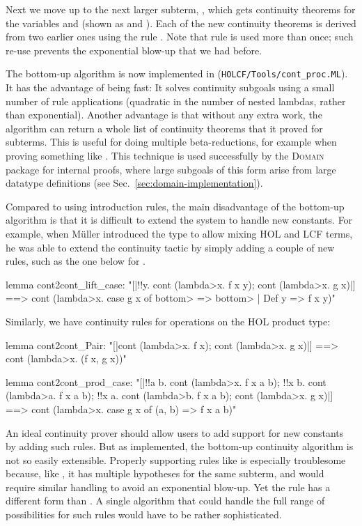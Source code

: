 Next we move up to the next larger subterm, , which gets continuity theorems for the variables  and  (shown as  and ). Each of the new continuity theorems is derived from two earlier ones using the rule . Note that rule  is used more than once; such re-use prevents the exponential blow-up that we had before.

The bottom-up algorithm is now implemented in  (\texttt{HOLCF/Tools{\slash}cont\_proc.ML}). It has the advantage of being fast: It solves continuity subgoals using a small number of rule applications (quadratic in the number of nested lambdas, rather than exponential). Another advantage is that without any extra work, the algorithm can return a whole list of continuity theorems that it proved for subterms. This is useful for doing multiple beta-reductions, for example when proving something like . This technique is used successfully by the \textsc{Domain} package for internal proofs, where large subgoals of this form arise from large datatype definitions (see Sec.~\ref{sec:domain-implementation}).

Compared to using introduction rules, the main disadvantage of the bottom-up algorithm is that it is difficult to extend the system to handle new constants. For example, when M\"{u}ller introduced the  type to allow mixing HOL and LCF terms, he was able to extend the continuity tactic by simply adding a couple of new rules, such as the one below for  \cite[\S5.2.2]{mueller98thesis} \cite[\S4.3.2]{hol+lcf}.
%
\begin{isacode}
lemma cont2cont_lift_case:
  "[|!!y. cont (\<lambda>x. f x y); cont (\<lambda>x. g x)|]
    ==> cont (\<lambda>x. case g x of \<bottom> => \<bottom> | Def y => f x y)"
\end{isacode}
%
Similarly, we have continuity rules for operations on the HOL product type:
%
\begin{isacode}
lemma cont2cont_Pair:
  "[|cont (\<lambda>x. f x); cont (\<lambda>x. g x)|] ==> cont (\<lambda>x. (f x, g x))"
\end{isacode}
\unmedskip
{}
\begin{isacode}
lemma cont2cont_prod_case:
  "[|!!a b. cont (\<lambda>x. f x a b); !!x b. cont (\<lambda>a. f x a b);
    !!x a. cont (\<lambda>b. f x a b); cont (\<lambda>x. g x)|]
    ==> cont (\<lambda>x. case g x of (a, b) => f x a b)"
\end{isacode}
%
An ideal continuity prover should allow users to add support for new constants by adding such rules. But as implemented, the bottom-up continuity algorithm is not so easily extensible. Properly supporting rules like  is especially troublesome because, like , it has multiple hypotheses for the same subterm, and would require similar handling to avoid an exponential blow-up. Yet the rule has a different form than . A single algorithm that could handle the full range of possibilities for such rules would have to be rather sophisticated.

